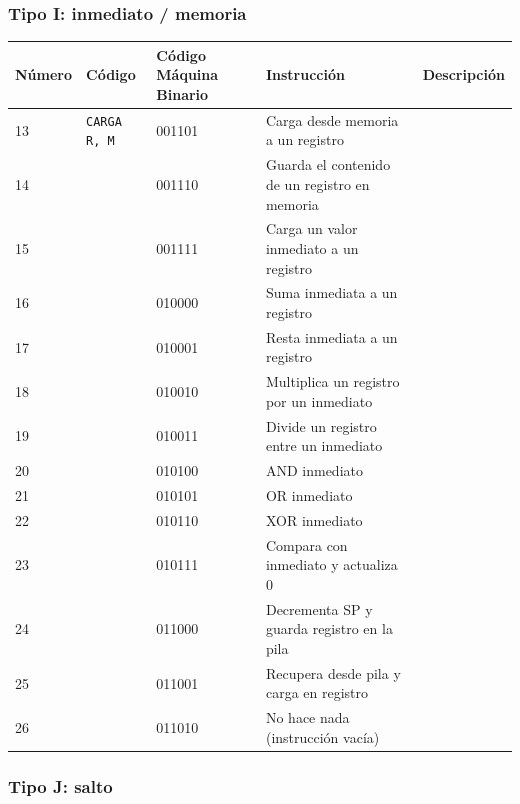 \documentclass{article}
\begin{document}
\subsubsection{Tipo I: \textbf{inmediato / memoria}}

\begin{table}[H]
    \centering
    \begin{tabular}{|p{1.3cm}|p{3cm}|p{1.6cm}|p{5cm}|p{4cm}|}
    \hline
    \textbf{Número} & \textbf{Código} & \textbf{Código Máquina Binario} & \textbf{Instrucción} & \textbf{Descripción} \\
    \hline
    13 & \texttt{CARGA R, M} & 001101 & Carga desde memoria a un registro & \\
    \hline
    14 & & 001110 & Guarda el contenido de un registro en memoria & \\
    \hline
    15 & & 001111 & Carga un valor inmediato a un registro & \\
    \hline
    16 & & 010000 & Suma inmediata a un registro & \\
    \hline
    17 & & 010001 & Resta inmediata a un registro & \\
    \hline
    18 & & 010010 & Multiplica un registro por un inmediato & \\
    \hline
    19 & & 010011 & Divide un registro entre un inmediato & \\
    \hline
    20 & & 010100 & AND inmediato & \\
    \hline
    21 & & 010101 & OR inmediato & \\
    \hline
    22 & & 010110 & XOR inmediato & \\
    \hline
    23 & & 010111 & Compara con inmediato y actualiza 0 & \\
    \hline
    24 & & 011000 & Decrementa SP y guarda registro en la pila & \\
    \hline
    25 & & 011001 & Recupera desde pila y carga en registro & \\
    \hline
    26 & & 011010 & No hace nada (instrucción vacía) & \\
    \hline
    \end{tabular}
\end{table}

\subsubsection{Tipo J: \textbf{salto}}
\end{document}
